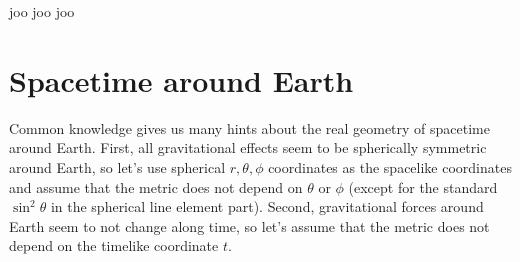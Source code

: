 \documentclass[11pt,oneside%
]{memoir}
\newenvironment{eqna}{\begin{IEEEeqnarray*}{c}}{\end{IEEEeqnarray*}\ignorespacesafterend}
\newenvironment{eqnb}{\begin{IEEEeqnarray*}{rCl}}{\end{IEEEeqnarray*}\ignorespacesafterend}
\newcommand{\der}[2]{\frac{\dd#1}{\dd#2}}
\newcommand{\dd}{\mathrm{d}}
\begin{document}
joo joo joo


\section{Spacetime around Earth}

Common knowledge gives us many hints about the real geometry of spacetime around Earth. First, all gravitational effects seem to be spherically symmetric around Earth, so let's use spherical \(r,\theta,\phi\) coordinates as the spacelike coordinates and assume that the metric does not depend on \(\theta\) or \(\phi\) (except for the standard \(\sin^2\theta\) in the spherical line element part). Second, gravitational forces around Earth seem to not change along time, so let's assume that the metric does not depend on the timelike coordinate \(t\).
\end{document}
